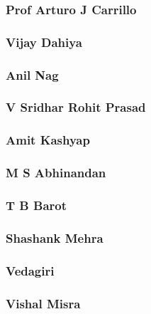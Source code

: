 \documentclass{article}
\begin{document}
\subsubsection{Prof Arturo J Carrillo}


\subsubsection{Vijay Dahiya}


\subsubsection{Anil Nag}


\subsubsection{V Sridhar Rohit Prasad}


\subsubsection{Amit Kashyap}


\subsubsection{M S Abhinandan}


\subsubsection{T B Barot}


\subsubsection{Shashank Mehra}


\subsubsection{Vedagiri}


\subsubsection{Vishal Misra}

\end{document}
